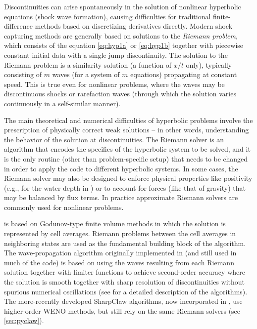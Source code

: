 
Discontinuities can arise spontaneously in the solution of nonlinear
hyperbolic equations (shock wave formation), causing difficulties for
traditional finite-difference methods based on discretizing derivatives
directly.   Modern shock capturing methods are generally based on solutions
to the {\em Riemann problem}, which consists of the equation 
\cref{eq:hyp1a} or \cref{eq:hyp1b}
together with piecewise constant initial data with a single jump discontinuity.
The solution to the Riemann problem is a similarity
solution (a function of $x/t$ only),
typically consisting of $m$ waves (for a system of $m$ equations)
propagating at constant speed.  This is true even for nonlinear problems,
where the waves may be discontinuous shocks or rarefaction waves
(through which the solution varies continuously in a self-similar manner).

The main theoretical
and numerical difficulties of hyperbolic problems involve the prescription of
physically correct weak solutions -- in other words, understanding the behavior
of the solution at discontinuities.  The Riemann solver is an algorithm that
encodes the specifics of the hyperbolic system to be solved, and it is the only
routine (other than problem-specific setup) that needs to be changed in order
to apply the code to different hyperbolic systems.  In some cases, the Riemann
solver may also be designed to enforce physical properties like positivity
(e.g., for the water depth in \geoclaw) or to account for forces (like that
of gravity) that may be balanced by flux terms.
In practice approximate Riemann solvers are commonly used for nonlinear
problems.%

\clawpack is based on Godunov-type finite volume methods in which
the solution is represented by cell averages.  Riemann problems
between the cell averages in neighboring states are used as the
fundamental building block of the algorithm.
The wave-propagation algorithm originally
implemented in \clawpack (and still used in much of the code) is based on
using the waves resulting from each Riemann solution together with limiter
functions to achieve second-order accuracy where the solution is smooth
together with sharp resolution of discontinuities without spurious numerical
oscillations (see \cite{rjl:fvmhp} for a detailed description of the
algorithms).   The more-recently developed SharpClaw algorithms,
now incorporated in
\pyclaw, use higher-order WENO methods, but still rely on the same Riemann
solvers (see \cref{sec:pyclaw}).  

